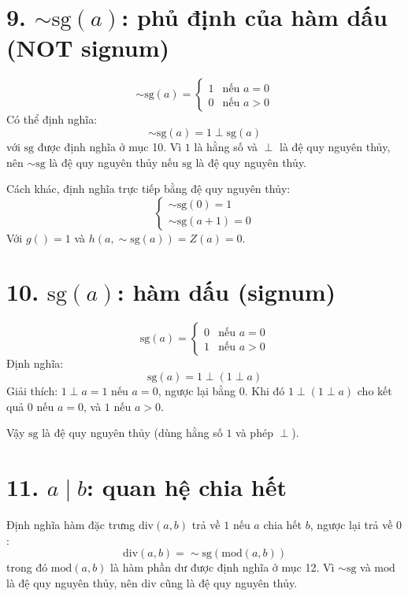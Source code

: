 \documentclass[12pt,a4paper]{article}
\begin{document}
\section*{9. $\sim\!\mathrm{sg}(a)$: phủ định của hàm dấu (NOT signum)}

\[
\sim\!\mathrm{sg}(a) = 
\begin{cases}
1 & \text{nếu } a = 0 \\
0 & \text{nếu } a > 0
\end{cases}
\]
Có thể định nghĩa:
\[
\sim\!\mathrm{sg}(a) = 1 \perp \mathrm{sg}(a)
\]
với $\mathrm{sg}$ được định nghĩa ở mục 10. Vì $1$ là hằng số và $\perp$ là đệ quy nguyên thủy, nên $\sim\!\mathrm{sg}$ là đệ quy nguyên thủy nếu $\mathrm{sg}$ là đệ quy nguyên thủy.

Cách khác, định nghĩa trực tiếp bằng đệ quy nguyên thủy:
\[
\begin{cases}
\sim\!\mathrm{sg}(0) = 1 \\
\sim\!\mathrm{sg}(a+1) = 0
\end{cases}
\]
Với $g() = 1$ và $h(a, \sim\!\mathrm{sg}(a)) = Z(a) = 0$.

\section*{10. $\mathrm{sg}(a)$: hàm dấu (signum)}

\[
\mathrm{sg}(a) = 
\begin{cases}
0 & \text{nếu } a = 0 \\
1 & \text{nếu } a > 0
\end{cases}
\]
Định nghĩa:
\[
\mathrm{sg}(a) = 1 \perp (1 \perp a)
\]
Giải thích: $1 \perp a = 1$ nếu $a = 0$, ngược lại bằng $0$. Khi đó $1 \perp (1 \perp a)$ cho kết quả $0$ nếu $a = 0$, và $1$ nếu $a > 0$.

Vậy $\mathrm{sg}$ là đệ quy nguyên thủy (dùng hằng số $1$ và phép $\perp$).

\section*{11. $a \mid b$: quan hệ chia hết}

Định nghĩa hàm đặc trưng $\mathrm{div}(a, b)$ trả về $1$ nếu $a$ chia hết $b$, ngược lại trả về $0$:
\[
\mathrm{div}(a, b) = \sim\!\mathrm{sg}(\mathrm{mod}(a, b))
\]
trong đó $\mathrm{mod}(a, b)$ là hàm phần dư được định nghĩa ở mục 12. Vì $\sim\!\mathrm{sg}$ và $\mathrm{mod}$ là đệ quy nguyên thủy, nên $\mathrm{div}$ cũng là đệ quy nguyên thủy.
\end{document}
